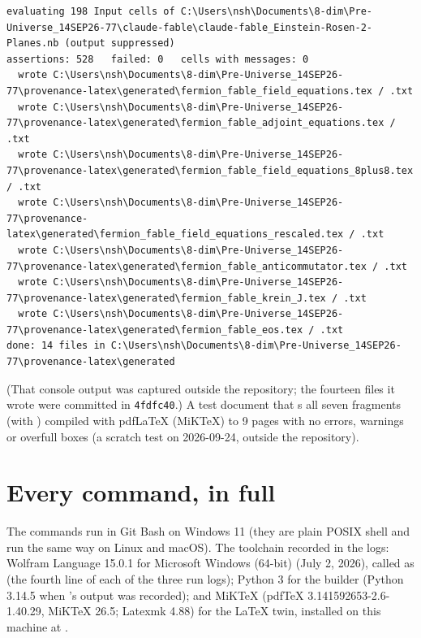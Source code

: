 \begin{Verbatim}[fontsize=\scriptsize]
evaluating 198 Input cells of C:\Users\nsh\Documents\8-dim\Pre-Universe_14SEP26-77\claude-fable\claude-fable_Einstein-Rosen-2-Planes.nb (output suppressed)
assertions: 528   failed: 0   cells with messages: 0
  wrote C:\Users\nsh\Documents\8-dim\Pre-Universe_14SEP26-77\provenance-latex\generated\fermion_fable_field_equations.tex / .txt
  wrote C:\Users\nsh\Documents\8-dim\Pre-Universe_14SEP26-77\provenance-latex\generated\fermion_fable_adjoint_equations.tex / .txt
  wrote C:\Users\nsh\Documents\8-dim\Pre-Universe_14SEP26-77\provenance-latex\generated\fermion_fable_field_equations_8plus8.tex / .txt
  wrote C:\Users\nsh\Documents\8-dim\Pre-Universe_14SEP26-77\provenance-latex\generated\fermion_fable_field_equations_rescaled.tex / .txt
  wrote C:\Users\nsh\Documents\8-dim\Pre-Universe_14SEP26-77\provenance-latex\generated\fermion_fable_anticommutator.tex / .txt
  wrote C:\Users\nsh\Documents\8-dim\Pre-Universe_14SEP26-77\provenance-latex\generated\fermion_fable_krein_J.tex / .txt
  wrote C:\Users\nsh\Documents\8-dim\Pre-Universe_14SEP26-77\provenance-latex\generated\fermion_fable_eos.tex / .txt
done: 14 files in C:\Users\nsh\Documents\8-dim\Pre-Universe_14SEP26-77\provenance-latex\generated
\end{Verbatim}

(That console output was captured outside the repository; the fourteen files it wrote were committed
in \texttt{4fdfc40}.) A test document that \verb||s all seven  fragments (with
) compiled with pdfLaTeX (MiKTeX) to 9 pages with no errors, warnings or overfull
boxes (a scratch test on 2026-09-24, outside the repository).

\section{Every command, in full}
\label{sec:11}

The commands run in Git Bash on Windows 11 (they are plain POSIX shell and run the same way on Linux
and macOS). The toolchain recorded in the logs: Wolfram Language 15.0.1 for Microsoft Windows
(64-bit) (July 2, 2026), called as  (the fourth line of each of the three run logs); Python 3 for
the builder (Python 3.14.5 when 's output was recorded); and MiKTeX (pdfTeX
3.141592653-2.6-1.40.29, MiKTeX 26.5; Latexmk 4.88) for the LaTeX twin, installed on this machine at
.

